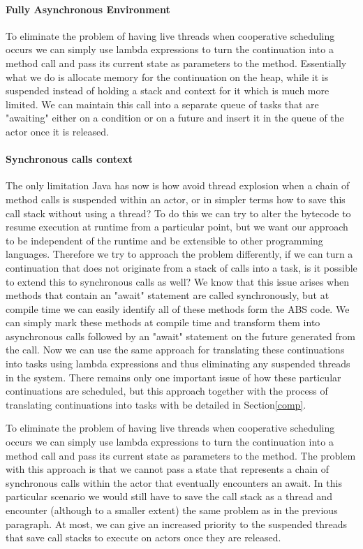\paragraph{Fully Asynchronous Environment}
To eliminate the problem of having live threads when cooperative scheduling occurs we can simply use lambda expressions to turn the continuation into a method call and pass its current state as parameters to the method. Essentially what we do is allocate memory for the continuation on the heap, while it is suspended instead of holding a stack and context for it which is much more limited.  We can maintain this call into a separate queue of tasks that are "awaiting" either  on a condition or on a future and insert it in the queue of the actor once it is released. 


\paragraph{Synchronous calls context}
The only limitation Java has now is how avoid thread explosion when a chain of method calls is suspended within an actor, or in simpler terms how to save this call stack without using a thread? To do this we can try to alter the bytecode to resume execution at runtime from a particular point, but we want our approach to be independent of the runtime and be extensible to other programming languages. Therefore we try to approach the problem differently, if we can turn a continuation that does not originate from a stack of calls into a task, is it possible to extend this to synchronous calls as well? We know that this issue arises when methods that contain an "await" statement are called synchronously, but at compile time we can easily identify all of these methods form the ABS code. We can simply mark these methods at compile time and transform them into asynchronous calls followed by an "await" statement on the future generated from the call. Now we can use the same approach for translating these continuations into tasks using lambda expressions and thus eliminating any suspended threads in the system. There remains only one important issue of how these particular continuations are scheduled, but this approach together with the process of translating continuations into tasks with be detailed in Section\ref{comp}. 


To eliminate the problem of having live threads when cooperative scheduling occurs we can simply use lambda expressions to turn the continuation into a method call and pass its current state as parameters to the method. The problem with this approach is that we cannot pass a state that represents a chain of synchronous calls within the actor that eventually encounters an await. In this particular scenario we would still have to save the call stack as a thread and encounter (although to a smaller extent) the same problem as in the previous paragraph. At most, we can give an increased priority to the suspended threads that save call stacks to execute on actors once they are released.



